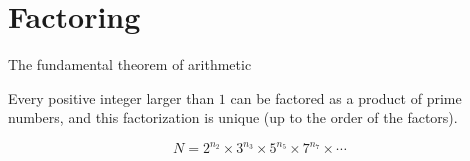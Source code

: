 
\part{Factoring}
\begin{frame}
  \partpage
\label{part:factoring}
\end{frame}


\begin{frame}{The fundamental theorem of arithmetic}
\begin{theorem}
Every positive integer larger than $1$ can be factored as a product of prime numbers, and this factorization is unique (up to the order of the factors).
\end{theorem}
\[
N = 2^{n_2} \times 3^{n_3} \times 5^{n_5} \times 7^{n_7} \times \cdots
\]
\end{frame}


